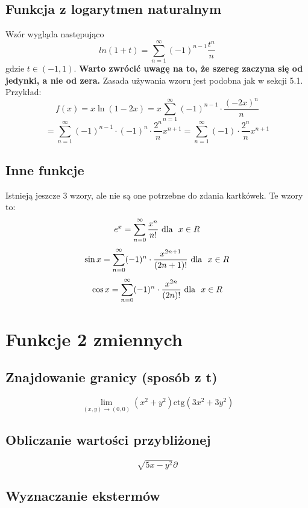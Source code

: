 \documentclass[11pt]{article}
\begin{document}
\subsection{Funkcja z logarytmen naturalnym}
\vbox{
    Wzór wygląda następująco
    \[
        ln(1 + t) = \sum_{n = 1}^{\infty}(-1)^{n - 1} \frac{t^n}{n}
    \]
    gdzie $t \in (-1, 1)$. \textbf{Warto zwrócić uwagę na to, że szereg zaczyna
    się od jedynki, a nie od zera.}
    Zasada używania wzoru jest podobna jak w sekcji 5.1. Przykład:
    \[
        f(x) = x \ln(1 - 2x) = 
        x \sum_{n = 1}^{\infty}(-1)^{n - 1} \cdot \frac{(-2x)^n}{n}
    \]
    \[
        = \sum_{n = 1}^{\infty}(-1)^{n - 1} \cdot (-1)^{n} \cdot \frac{2^n}{n} x^{n + 1}
        = \sum_{n = 1}^{\infty} (-1) \cdot \frac{2^n}{n} x^{n + 1}
    \]
}

\subsection{Inne funkcje}
\vbox{
    Istnieją jeszcze 3 wzory, ale nie są one potrzebne do zdania kartkówek.
    Te wzory to:
    \[
        e^x = \sum_{n = 0}^{\infty} \frac{x^n}{n!} \text{\space dla \space} x \in R
    \]
    \[
        \sin{x} = \sum_{n = 0}^{\infty} (-1)^n \cdot \frac{x^{2n + 1}}{(2n + 1)!} \text{\space dla \space} x \in R
    \]
    \[
        \cos{x} = \sum_{n = 0}^{\infty} (-1)^n \cdot \frac{x^{2n}}{(2n)!} \text{\space dla \space} x \in R
    \]
}

\section{Funkcje 2 zmiennych}
\subsection{Znajdowanie granicy (sposób z t)}
\vbox{
    \[
        \lim_{(x,y) \to (0,0)}(x^2 + y^2) \text{ctg} (3x^2 + 3y^2)
    \]
}
\subsection{Obliczanie wartości przybliżonej}
\vbox{
    \[
        \sqrt{5x - y^2} \partial
    \]
}
\subsection{Wyznaczanie ekstermów}
\end{document}
